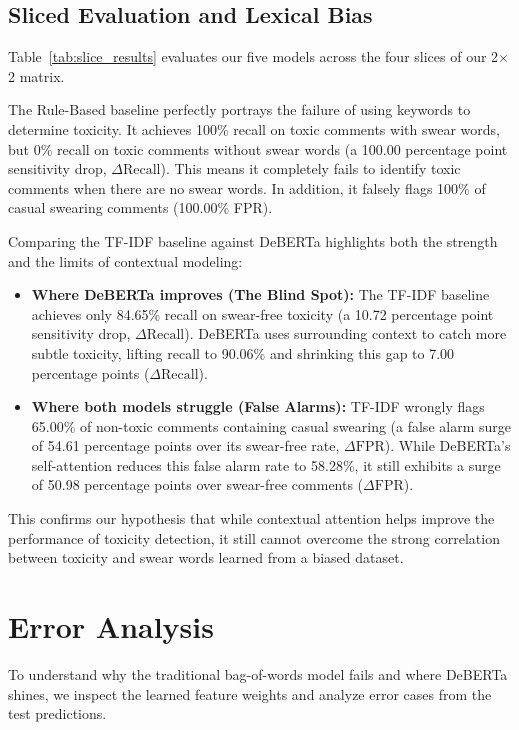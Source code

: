 \documentclass[11pt]{article}
\begin{document}
\subsection{Sliced Evaluation and Lexical Bias}

Table~\ref{tab:slice_results} evaluates our five models across the
four slices of our 2$\times$2 matrix.

The Rule-Based baseline perfectly portrays the failure of using
keywords to determine toxicity. It achieves 100\% recall on toxic
comments with swear words, but 0\% recall on toxic comments without
swear words (a 100.00 percentage point sensitivity drop,
$\Delta\text{Recall}$). This means it completely fails to identify
toxic comments when there are no swear words. In addition, it
falsely flags 100\% of casual swearing comments (100.00\% FPR).

Comparing the TF-IDF baseline against DeBERTa highlights both the
strength and the limits of contextual modeling:
\begin{itemize}
  \item \textbf{Where DeBERTa improves (The Blind Spot):} The TF-IDF
    baseline achieves only 84.65\% recall on swear-free toxicity
    (a 10.72 percentage point sensitivity drop, $\Delta\text{Recall}$).
    DeBERTa uses surrounding context to catch more subtle toxicity,
    lifting recall to 90.06\% and shrinking this gap to 7.00
    percentage points ($\Delta\text{Recall}$).
  \item \textbf{Where both models struggle (False Alarms):} TF-IDF
    wrongly flags 65.00\% of non-toxic comments containing casual
    swearing (a false alarm surge of 54.61 percentage points over its
    swear-free rate, $\Delta\text{FPR}$). While DeBERTa's self-attention
    reduces this false alarm rate to 58.28\%, it still exhibits a
    surge of 50.98 percentage points over swear-free comments
    ($\Delta\text{FPR}$).
\end{itemize}

This confirms our hypothesis that while contextual attention helps
improve the performance of toxicity detection, it still cannot
overcome the strong correlation between toxicity and swear words
learned from a biased dataset.

\section{Error Analysis}

To understand why the traditional bag-of-words model fails and where
DeBERTa shines, we inspect the learned feature weights and analyze
error cases from the test predictions.
\end{document}
